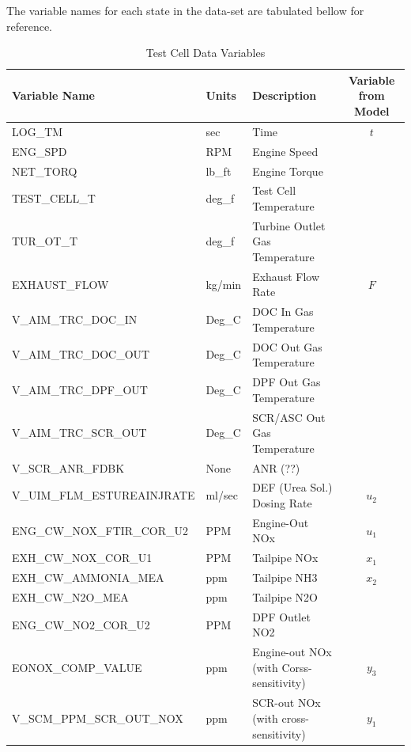 The variable names for each state in the data-set are tabulated bellow for reference.
\begin{table}[H]
\centering
\begin{tabular}{l l l c}
   \hline \hline
   Variable Name                 & Units  & Description & Variable from Model \\ \hline \hline
   LOG\_TM	                     & sec    & Time
                                          & $t$\\
   ENG\_SPD	                     & RPM    & Engine Speed
                                          &\\
   NET\_TORQ	                 & lb\_ft & Engine Torque
                                          &\\
   TEST\_CELL\_T	             & deg\_f & Test Cell Temperature
                                          &\\
   TUR\_OT\_T	                 & deg\_f & Turbine Outlet Gas Temperature
                                          &\\
   EXHAUST\_FLOW	             & kg/min & Exhaust Flow Rate
                                          & $F$\\
   V\_AIM\_TRC\_DOC\_IN	         & Deg\_C & DOC In Gas Temperature
                                          &\\
   V\_AIM\_TRC\_DOC\_OUT	     & Deg\_C & DOC Out Gas Temperature
                                          &\\
   V\_AIM\_TRC\_DPF\_OUT	     & Deg\_C & DPF Out Gas Temperature
                                          &\\
   V\_AIM\_TRC\_SCR\_OUT	     & Deg\_C & SCR/ASC Out Gas Temperature
                                          &\\
   V\_SCR\_ANR\_FDBK	         & None   & ANR (??)
                                          &\\
   V\_UIM\_FLM\_ESTUREAINJRATE	 & ml/sec & DEF (Urea Sol.) Dosing Rate
                                          & $u_2$\\
   ENG\_CW\_NOX\_FTIR\_COR\_U2	 & PPM    & Engine-Out NOx
                                          & $u_1$\\
   EXH\_CW\_NOX\_COR\_U1	     & PPM    & Tailpipe NOx
                                          & $x_1$\\
   EXH\_CW\_AMMONIA\_MEA	     & ppm    & Tailpipe NH3
                                          & $x_2$\\
   EXH\_CW\_N2O\_MEA	         & ppm    & Tailpipe N2O
                                          &\\
   ENG\_CW\_NO2\_COR\_U2	     & PPM    & DPF Outlet NO2
                                          &\\
EONOX\_COMP\_VALUE	         & ppm    & Engine-out NOx (with Corss-sensitivity)
                                      & $y_3$\\
V\_SCM\_PPM\_SCR\_OUT\_NOX	 & ppm    & SCR-out NOx  (with cross-sensitivity)                    & $y_1$\\
   \hline \hline
\end{tabular}
\caption{Test Cell Data Variables}
\end{table}

